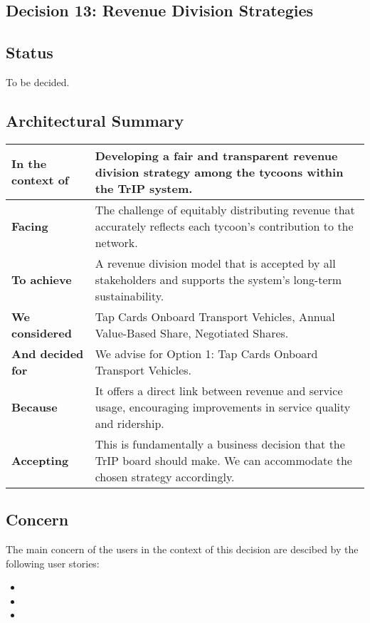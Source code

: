 \subsection{Decision 13: Revenue Division Strategies}

\subsection*{Status}
To be decided.

\subsection*{Architectural Summary}
\begin{tabular}{|p{3.5cm}|p{10.5cm}|}
    \hline
    \textbf{In the context of} & Developing a fair and transparent revenue division strategy among the tycoons within the TrIP system. \\
    \hline
    \textbf{Facing} & The challenge of equitably distributing revenue that accurately reflects each tycoon's contribution to the network. \\
    \hline
    \textbf{To achieve} & A revenue division model that is accepted by all stakeholders and supports the system's long-term sustainability. \\
    \hline
    \textbf{We considered} & Tap Cards Onboard Transport Vehicles, Annual Value-Based Share, Negotiated Shares. \\
    \hline
    \textbf{And decided for} & We advise for Option 1: Tap Cards Onboard Transport Vehicles. \\
    \hline
    \textbf{Because} & It offers a direct link between revenue and service usage, encouraging improvements in service quality and ridership. \\
    \hline
    \textbf{Accepting} & This is fundamentally a business decision that the TrIP board should make. We can accommodate the chosen strategy accordingly. \\
    \hline
\end{tabular}

\subsection*{Concern}
The main concern of the users in the context of this decision are descibed by the following user stories: 
\begin{itemize}
    \item \userStoryTwentyOne
    \item \userStoryTwentyThree 
    \item \userStoryTwentyFour
\end{itemize}


